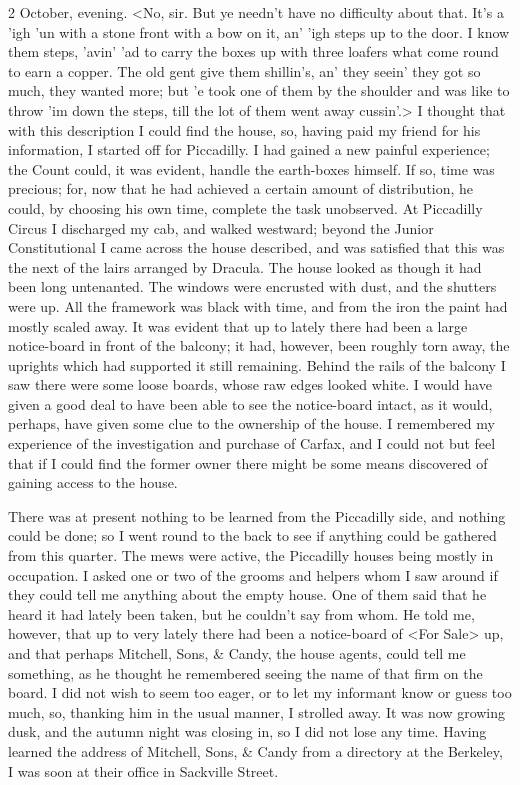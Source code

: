 \begin{diary}{2 October, evening.}
<No, sir. But ye needn't have no difficulty about that. It's a 'igh 'un with a stone front with a bow on it, an' 'igh steps up to the door. I know them steps, 'avin' 'ad to carry the boxes up with three loafers what come round to earn a copper. The old gent give them shillin's, an' they seein' they got so much, they wanted more; but 'e took one of them by the shoulder and was like to throw 'im down the steps, till the lot of them went away cussin'.> I thought that with this description I could find the house, so, having paid my friend for his information, I started off for Piccadilly. I had gained a new painful experience; the Count could, it was evident, handle the earth-boxes himself. If so, time was precious; for, now that he had achieved a certain amount of distribution, he could, by choosing his own time, complete the task unobserved. At Piccadilly Circus I discharged my cab, and walked westward; beyond the Junior Constitutional I came across the house described, and was satisfied that this was the next of the lairs arranged by Dracula. The house looked as though it had been long untenanted. The windows were encrusted with dust, and the shutters were up. All the framework was black with time, and from the iron the paint had mostly scaled away. It was evident that up to lately there had been a large notice-board in front of the balcony; it had, however, been roughly torn away, the uprights which had supported it still remaining. Behind the rails of the balcony I saw there were some loose boards, whose raw edges looked white. I would have given a good deal to have been able to see the notice-board intact, as it would, perhaps, have given some clue to the ownership of the house. I remembered my experience of the investigation and purchase of Carfax, and I could not but feel that if I could find the former owner there might be some means discovered of gaining access to the house.

There was at present nothing to be learned from the Piccadilly side, and nothing could be done; so I went round to the back to see if anything could be gathered from this quarter. The mews were active, the Piccadilly houses being mostly in occupation. I asked one or two of the grooms and helpers whom I saw around if they could tell me anything about the empty house. One of them said that he heard it had lately been taken, but he couldn't say from whom. He told me, however, that up to very lately there had been a notice-board of <For Sale> up, and that perhaps Mitchell, Sons, \& Candy, the house agents, could tell me something, as he thought he remembered seeing the name of that firm on the board. I did not wish to seem too eager, or to let my informant know or guess too much, so, thanking him in the usual manner, I strolled away. It was now growing dusk, and the autumn night was closing in, so I did not lose any time. Having learned the address of Mitchell, Sons, \& Candy from a directory at the Berkeley, I was soon at their office in Sackville Street.


\end{diary}
